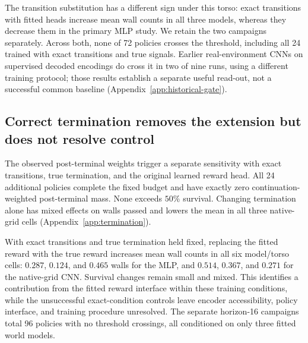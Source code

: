 The transition substitution has a different sign under this torso: exact transitions with fitted
heads increase mean wall counts in all three models, whereas they decrease them in the primary MLP
study. We retain the two campaigns separately. Across both, none of 72 policies crosses the threshold,
including all 24 trained with exact transitions and true signals. Earlier real-environment CNNs on
supervised decoded encodings do cross it in two of nine runs, using a different training protocol;
those results establish a separate useful read-out, not a successful common baseline
(Appendix~\ref{app:historical-gate}).


\subsection{Correct termination removes the extension but does not resolve control}
\label{sec:termination}
The observed post-terminal weights trigger a separate sensitivity with exact transitions, true
termination, and the original learned reward head. All 24 additional policies complete the fixed
budget and have exactly zero continuation-weighted post-terminal mass. None exceeds $50\%$ survival.
Changing termination alone has mixed effects on walls passed and lowers the mean in all three
native-grid cells (Appendix~\ref{app:termination}).

With exact transitions and true termination held fixed, replacing the fitted reward with the true
reward increases mean wall counts in all six model/torso cells: $0.287$, $0.124$, and $0.465$ walls
for the MLP, and $0.514$, $0.367$, and $0.271$ for the native-grid CNN. Survival changes remain small
and mixed. This identifies a contribution from the fitted reward interface within these training
conditions, while the unsuccessful exact-condition controls leave encoder accessibility, policy
interface, and training procedure unresolved. The separate horizon-16 campaigns total 96 policies
with no threshold crossings, all conditioned on only three fitted world models.
